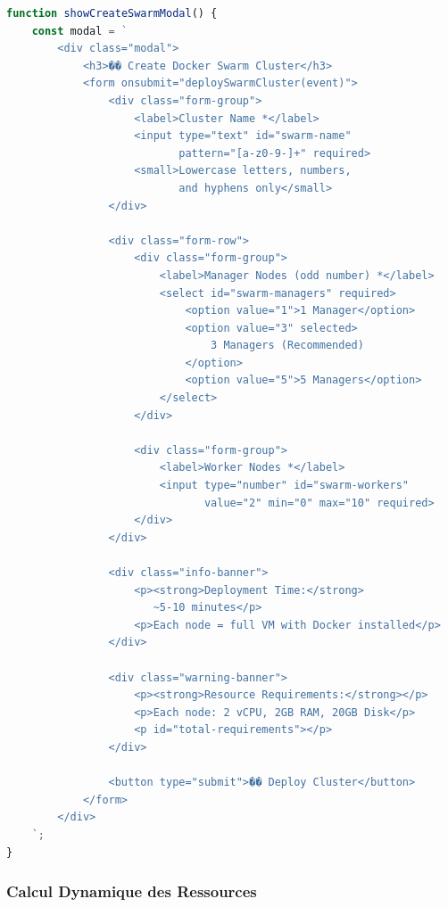 \documentclass[12pt,a4paper]{article}
\begin{document}
\begin{lstlisting}[language=JavaScript,caption=Création cluster Swarm (swarm.js)]
function showCreateSwarmModal() {
    const modal = `
        <div class="modal">
            <h3>�� Create Docker Swarm Cluster</h3>
            <form onsubmit="deploySwarmCluster(event)">
                <div class="form-group">
                    <label>Cluster Name *</label>
                    <input type="text" id="swarm-name" 
                           pattern="[a-z0-9-]+" required>
                    <small>Lowercase letters, numbers, 
                           and hyphens only</small>
                </div>
                
                <div class="form-row">
                    <div class="form-group">
                        <label>Manager Nodes (odd number) *</label>
                        <select id="swarm-managers" required>
                            <option value="1">1 Manager</option>
                            <option value="3" selected>
                                3 Managers (Recommended)
                            </option>
                            <option value="5">5 Managers</option>
                        </select>
                    </div>
                    
                    <div class="form-group">
                        <label>Worker Nodes *</label>
                        <input type="number" id="swarm-workers" 
                               value="2" min="0" max="10" required>
                    </div>
                </div>
                
                <div class="info-banner">
                    <p><strong>Deployment Time:</strong> 
                       ~5-10 minutes</p>
                    <p>Each node = full VM with Docker installed</p>
                </div>
                
                <div class="warning-banner">
                    <p><strong>Resource Requirements:</strong></p>
                    <p>Each node: 2 vCPU, 2GB RAM, 20GB Disk</p>
                    <p id="total-requirements"></p>
                </div>
                
                <button type="submit">�� Deploy Cluster</button>
            </form>
        </div>
    `;
}
\end{lstlisting}

\subsubsection{Calcul Dynamique des Ressources}
\end{document}
